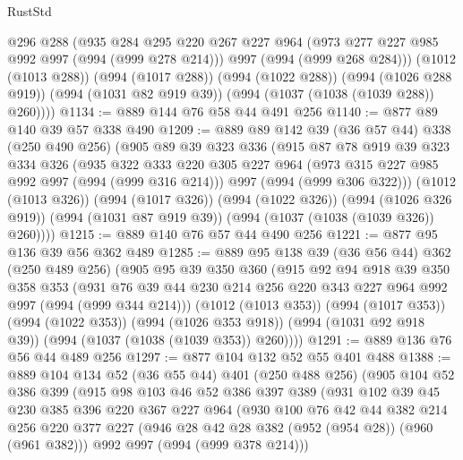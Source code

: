 \begin{lexlean}{RustStd}
\begin{coremodule}
        @296
        @288
        (@935
          @284
          @295
          @220
          @267
          @227
          @964
          (@973 @277 @227 @985 @992 @997 (@994 (@999 @278 @214)))
          @997
          (@994 (@999 @268 @284)))
        (@1012 (@1013 @288))
        (@994 (@1017 @288))
        (@994 (@1022 @288))
        (@994 (@1026 @288 @919))
        (@994 (@1031 @82 @919 @39))
        (@994 (@1037 (@1038 (@1039 @288)) @260))))
@1134 := @889 @144 @76 @58 @44 @491 @256
@1140 := @877 @89 @140 @39 @57 @338 @490
@1209 := @889
    @89
    @142
    @39
    (@36 @57 @44)
    @338
    (@250 @490 @256)
    (@905
      @89
      @39
      @323
      @336
      (@915
        @87
        @78
        @919
        @39
        @323
        @334
        @326
        (@935
          @322
          @333
          @220
          @305
          @227
          @964
          (@973 @315 @227 @985 @992 @997 (@994 (@999 @316 @214)))
          @997
          (@994 (@999 @306 @322)))
        (@1012 (@1013 @326))
        (@994 (@1017 @326))
        (@994 (@1022 @326))
        (@994 (@1026 @326 @919))
        (@994 (@1031 @87 @919 @39))
        (@994 (@1037 (@1038 (@1039 @326)) @260))))
@1215 := @889 @140 @76 @57 @44 @490 @256
@1221 := @877 @95 @136 @39 @56 @362 @489
@1285 := @889
    @95
    @138
    @39
    (@36 @56 @44)
    @362
    (@250 @489 @256)
    (@905
      @95
      @39
      @350
      @360
      (@915
        @92
        @94
        @918
        @39
        @350
        @358
        @353
        (@931 @76 @39 @44 @230 @214 @256 @220 @343 @227 @964 @992 @997 (@994 (@999 @344 @214)))
        (@1012 (@1013 @353))
        (@994 (@1017 @353))
        (@994 (@1022 @353))
        (@994 (@1026 @353 @918))
        (@994 (@1031 @92 @918 @39))
        (@994 (@1037 (@1038 (@1039 @353)) @260))))
@1291 := @889 @136 @76 @56 @44 @489 @256
@1297 := @877 @104 @132 @52 @55 @401 @488
@1388 := @889
    @104
    @134
    @52
    (@36 @55 @44)
    @401
    (@250 @488 @256)
    (@905
      @104
      @52
      @386
      @399
      (@915
        @98
        @103
        @46
        @52
        @386
        @397
        @389
        (@931
          @102
          @39
          @45
          @230
          @385
          @396
          @220
          @367
          @227
          @964
          (@930
            @100
            @76
            @42
            @44
            @382
            @214
            @256
            @220
            @377
            @227
            (@946 @28 @42 @28 @382 (@952 (@954 @28)) (@960 (@961 @382)))
            @992
            @997
            (@994 (@999 @378 @214)))

\end{coremodule}
\end{lexlean}
